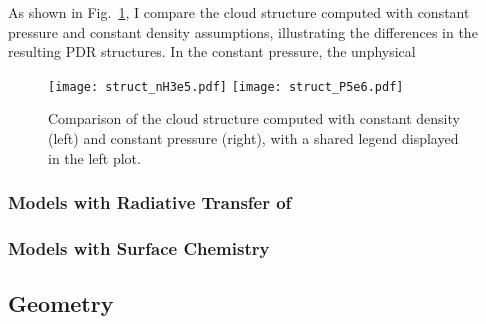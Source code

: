 \documentclass[12pt,a4paper]{article}
\newcommand{\qt}[1]{\textcolor{red}{#1}}
\begin{document}
As shown in Fig.~\ref{fig:cmp_cstp_cstn}, I compare the cloud structure computed with constant pressure and constant density assumptions, illustrating the differences in the resulting PDR structures. In the constant pressure, the unphysical 

\begin{figure}
    \centering
    \texttt{[image: struct\_nH3e5.pdf]}
    \texttt{[image: struct\_P5e6.pdf]}
    \caption{Comparison of the cloud structure computed with constant density (left) and constant pressure (right), with a shared legend displayed in the left plot.} \label{fig:cmp_cstp_cstn}
\end{figure}

\subsubsection{Models with Radiative Transfer of }
\subsubsection{Models with Surface Chemistry}

\subsection{Geometry}
\end{document}

